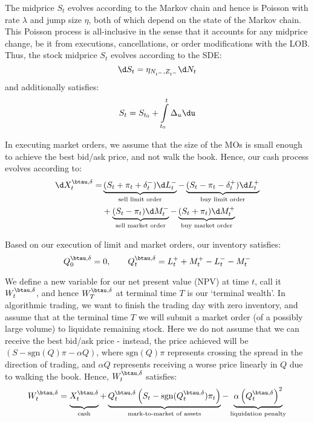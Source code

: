 \documentclass[12pt]{article}
\begin{document}
The midprice $S_t$ evolves according to the Markov chain and hence is Poisson with rate $\lambda$ and jump size $\eta$, both of which depend on the state of the Markov chain. This Poisson process is all-inclusive in the sense that it accounts for any midprice change, be it from executions, cancellations, or order modifications with the LOB. Thus, the stock midprice $S_t$ evolves according to the SDE:
\begin{equation}\label{eq:stockprocess}
\d S_t = \eta_{N_{t^-},Z_{t^-}} \d N_t
\end{equation}
and additionally satisfies:
\begin{equation}\label{eq:stockintegral} 
S_t = S_{t_0} + \int\limits_{t_0}^t \Delta_u \du
\end{equation}

In executing market orders, we assume that the size of the MOs is small enough to achieve the best bid/ask price, and not walk the book. Hence, our cash process evolves according to:
\begin{equation}\label{eq:cashprocess}
\begin{split}
\d X^{\btau, \delta}_t = 	&\underbrace{(S_t + \pi_t + \delta^{-}_t) \d L^{-}_t}_{\text{sell limit order}} - \underbrace{(S_t - \pi_t - \delta^{+}_t) \d L^{+}_t}_{\text{buy limit order}} \\
						&+ \underbrace{(S_t - \pi_t) \d M^{-}_t}_{\text{sell market order}} - \underbrace{(S_t + \pi_t) \d M^{+}_t}_{\text{buy market order}}
\end{split}
\end{equation}

Based on our execution of limit and market orders, our inventory satisfies:
\begin{equation}\label{eq:inventory}
Q^{\btau, \delta}_0 = 0, \qquad Q^{\btau, \delta}_t = L^+_t + M^+_t - L^-_t - M^-_t
\end{equation}

We define a new variable for our net present value (NPV) at time $t$, call it $W^{\btau, \delta}_t$, and hence $W^{\btau, \delta}_T$ at terminal time $T$ is our `terminal wealth'. In algorithmic trading, we want to finish the trading day with zero inventory, and assume that at the terminal time $T$ we will submit a market order (of a possibly large volume) to liquidate remaining stock. Here we do not assume that we can receive the best bid/ask price - instead, the price achieved will be $(S - \mathrm{sgn}(Q)\pi - \alpha Q)$, where $\mathrm{sgn}(Q)\pi$ represents crossing the spread in the direction of trading, and $\alpha Q$ represents receiving a worse price linearly in $Q$ due to walking the book. Hence, $W^{\btau, \delta}_t$ satisfies:
\begin{equation}
\label{eq:terminalwealth}
W^{\btau, \delta}_t = \underbrace{\vphantom{\left( Q^{\btau, \delta}_t) \right)}X^{\btau, \delta}_t}_{\text{cash}}+ \underbrace{Q^{\btau, \delta}_t \left( S_t - \mathrm{sgn}(Q^{\btau, \delta}_t)\pi_t \right)}_{\text{mark-to-market of assets}} - \underbrace{\alpha \left( Q^{\btau, \delta}_t \right)^2}_{\text{liquidation penalty}}
\end{equation}
\end{document}
